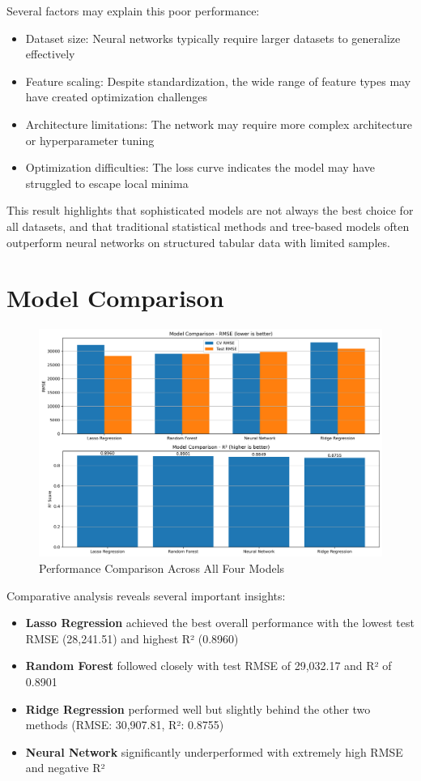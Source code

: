 Several factors may explain this poor performance:
\begin{itemize}
    \item Dataset size: Neural networks typically require larger datasets to generalize effectively
    \item Feature scaling: Despite standardization, the wide range of feature types may have created optimization challenges
    \item Architecture limitations: The network may require more complex architecture or hyperparameter tuning
    \item Optimization difficulties: The loss curve indicates the model may have struggled to escape local minima
\end{itemize}

This result highlights that sophisticated models are not always the best choice for all datasets, and that traditional statistical methods and tree-based models often outperform neural networks on structured tabular data with limited samples.

\section{Model Comparison}
\begin{figure}[H]
    \centering
    \includegraphics[width=1.0\textwidth]{figures/model_comparison.png}
    \caption{Performance Comparison Across All Four Models}
    \label{fig:model_comparison}
\end{figure}

Comparative analysis reveals several important insights:
\begin{itemize}
    \item \textbf{Lasso Regression} achieved the best overall performance with the lowest test RMSE (28,241.51) and highest R² (0.8960)
    \item \textbf{Random Forest} followed closely with test RMSE of 29,032.17 and R² of 0.8901
    \item \textbf{Ridge Regression} performed well but slightly behind the other two methods (RMSE: 30,907.81, R²: 0.8755)
    \item \textbf{Neural Network} significantly underperformed with extremely high RMSE and negative R²
\end{itemize}


